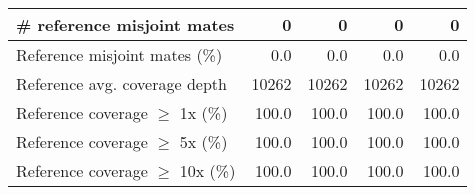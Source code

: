 \documentclass[12pt,a4paper]{article}
\begin{document}
\begin{table}[ht]
\begin{center}
\begin{tabular}{|l*{4}{|r}|}
\# reference misjoint mates & 0 & 0 & 0 & 0 \\ \hline
Reference misjoint mates (\%) & 0.0 & 0.0 & 0.0 & 0.0 \\ \hline
Reference avg. coverage depth & 10262 & 10262 & 10262 & 10262 \\ \hline
Reference coverage $\geq$ 1x (\%) & 100.0 & 100.0 & 100.0 & 100.0 \\ \hline
Reference coverage $\geq$ 5x (\%) & 100.0 & 100.0 & 100.0 & 100.0 \\ \hline
Reference coverage $\geq$ 10x (\%) & 100.0 & 100.0 & 100.0 & 100.0 \\ \hline
\end{tabular}
\end{center}
\end{table}
\end{document}
